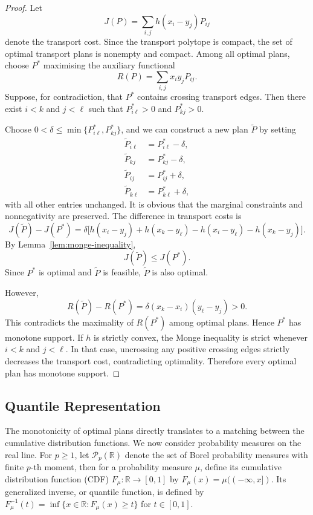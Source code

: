 \documentclass[11pt,a4paper]{article}
\theoremstyle{definition}
\begin{document}
\begin{proof}
Let
\[
J(P)=\sum_{i,j}h(x_i-y_j)P_{ij}
\]
denote the transport cost. Since the transport polytope is compact,
the set of optimal transport plans is nonempty and compact.
Among all optimal plans, choose $P^*$ maximising the auxiliary functional
\[
R(P)=\sum_{i,j}x_i y_jP_{ij}.
\]
Suppose, for contradiction, that $P^*$ contains crossing transport edges.
Then there exist $i<k$ and $j<\ell$ such that $P^*_{i\ell}>0$ and $P^*_{kj}>0$.

Choose $0<\delta\leq\min\{P^*_{i\ell},P^*_{kj}\}$, and we can construct a new plan $\widetilde P$
by setting
\[
\begin{aligned}
\widetilde P_{i\ell}
&=P^*_{i\ell}-\delta,\\
\widetilde P_{kj}
&=P^*_{kj}-\delta,\\
\widetilde P_{ij}
&=P^*_{ij}+\delta,\\
\widetilde P_{k\ell}
&=P^*_{k\ell}+\delta,
\end{aligned}
\]
with all other entries unchanged. It is obvious that the marginal constraints and nonnegativity
are preserved. The difference in transport costs is
\[
J(\widetilde P)-J(P^*)
=\delta\bigl[h(x_i-y_j)+h(x_k-y_\ell)-h(x_i-y_\ell)-h(x_k-y_j)\bigr].
\]
By Lemma~\ref{lem:monge-inequality},
\[
J(\widetilde P)\leq J(P^*).
\]
Since $P^*$ is optimal and $\widetilde P$ is feasible, $\widetilde P$ is also optimal.

However,
\[
R(\widetilde P)-R(P^*)=\delta(x_k-x_i)(y_\ell-y_j)>0.
\]
This contradicts the maximality of $R(P^*)$ among optimal plans. Hence $P^*$ has monotone support.
If $h$ is strictly convex, the Monge inequality is strict whenever $i<k$ and $j<\ell$.
In that case, uncrossing any positive crossing edges strictly decreases the transport cost, contradicting
optimality. Therefore every optimal plan has monotone support.
\end{proof}

\subsection{Quantile Representation}
The monotonicity of optimal plans directly translates to a matching between the cumulative distribution functions.
We now consider probability measures on the real line. For $p\geq1$, let
$\mathcal{P}_p(\mathbb{R})$ denote the set of Borel probability measures
with finite $p$-th moment, then for a probability measure $\mu$,
define its cumulative distribution function (CDF) $F_\mu:\mathbb{R}\to[0,1]$ by $F_\mu(x)=\mu((-\infty,x])$. Its generalized inverse, or quantile function, is defined by
$F_\mu^{-1}(t)=\inf\{x\in\mathbb{R}:F_\mu(x)\geq t\}$ for $t\in[0,1]$.
\end{document}
